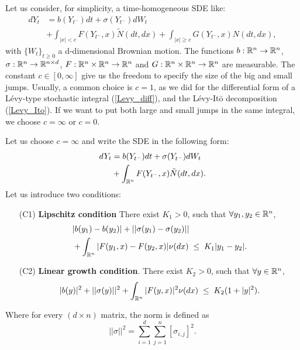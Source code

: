 Let us consider, for simplicity, a time-homogeneous SDE like:
\begin{align} \label{SDE}
 dY_t &= b(Y_{t^-} ) dt  + \sigma(Y_{t^-}) dW_t\\ \nonumber
     &+ \int_{|x|<c} F(Y_{t^-},x) \tilde N (dt,dx) + \int_{|x|\geq c} G(Y_{t^-},x) N(dt,dx),
\end{align}
with $\{W_t\}_{t\geq 0}$ a d-dimensional Brownian motion. 
The functions $b:\mathbb{R}^n \to \mathbb{R}^n$, $\sigma:\mathbb{R}^n \to \mathbb{R}^{n\times d}$, $F:\mathbb{R}^n\times \mathbb{R}^n \to \mathbb{R}^n$ and $G:\mathbb{R}^n \times \mathbb{R}^n \to \mathbb{R}^n$ are measurable. 
The constant $c \in [0,\infty]$ give us the freedom to specify the size of the big and small jumps.
Usually, a common choice is $c=1$, as we did for the differential form of a Lévy-type stochastic integral (\ref{Levy_diff}), and 
the Lévy-It\={o} decomposition (\ref{Levy_Ito}).
If we want to put both large and small jumps in the same integral, we choose $c = \infty$ or $c=0$.

Let us choose $c=\infty$ and write the SDE in the following form:
\begin{align} \label{modSDE}
 dY_t &= b(Y_{t^-}) dt  + \sigma(Y_{t^-}) dW_t\\ \nonumber
     &+ \int_{\mathbb{R}^n} F(Y_{t^-},x) \tilde N (dt,dx).
\end{align}
Let us introduce two conditions:
\begin{itemize}
 \item[(C1)] \textbf{Lipschitz condition} There exist $K_1 >0$, such that $\forall y_1,y_2 \in \mathbb{R}^n$,
 \begin{align}\label{Lipschitz}
  &|b(y_1) - b(y_2)| + || \sigma(y_1) - \sigma(y_2) ||  \\ 
  & + \int_{\R^n} |F(y_1,x)-F(y_2,x)| \nu(dx) \; \leq  \; K_1 |y_1-y_2|. \nonumber %
 \end{align}
 \item[(C2)] \textbf{Linear growth condition}. There exist $K_2>0$, such that $\forall y \in \mathbb{R}^n$,
 \begin{align}\label{Growth}
  |b(y)|^2 + ||\sigma(y)||^2 
   + \int_{\R^n} |F(y,x)|^2 \nu(dx) \; \leq \; K_2 (1+|y|^2).    %
 \end{align}
\end{itemize}
Where for every $(d\times n)$ matrix, the norm is defined as
\begin{equation}
 || \sigma ||^2 = \sum_{i=1}^d \sum_{j=1}^n [\sigma_{i,j}]^2 .
\end{equation}

